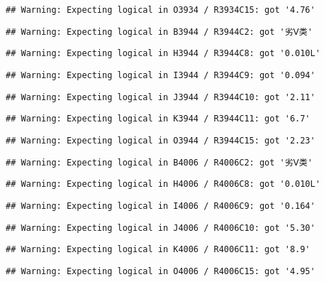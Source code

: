 \documentclass[
]{article}
\begin{document}
\begin{verbatim}
## Warning: Expecting logical in O3934 / R3934C15: got '4.76'
\end{verbatim}

\begin{verbatim}
## Warning: Expecting logical in B3944 / R3944C2: got '劣Ⅴ类'
\end{verbatim}

\begin{verbatim}
## Warning: Expecting logical in H3944 / R3944C8: got '0.010L'
\end{verbatim}

\begin{verbatim}
## Warning: Expecting logical in I3944 / R3944C9: got '0.094'
\end{verbatim}

\begin{verbatim}
## Warning: Expecting logical in J3944 / R3944C10: got '2.11'
\end{verbatim}

\begin{verbatim}
## Warning: Expecting logical in K3944 / R3944C11: got '6.7'
\end{verbatim}

\begin{verbatim}
## Warning: Expecting logical in O3944 / R3944C15: got '2.23'
\end{verbatim}

\begin{verbatim}
## Warning: Expecting logical in B4006 / R4006C2: got '劣Ⅴ类'
\end{verbatim}

\begin{verbatim}
## Warning: Expecting logical in H4006 / R4006C8: got '0.010L'
\end{verbatim}

\begin{verbatim}
## Warning: Expecting logical in I4006 / R4006C9: got '0.164'
\end{verbatim}

\begin{verbatim}
## Warning: Expecting logical in J4006 / R4006C10: got '5.30'
\end{verbatim}

\begin{verbatim}
## Warning: Expecting logical in K4006 / R4006C11: got '8.9'
\end{verbatim}

\begin{verbatim}
## Warning: Expecting logical in O4006 / R4006C15: got '4.95'
\end{verbatim}
\end{document}
